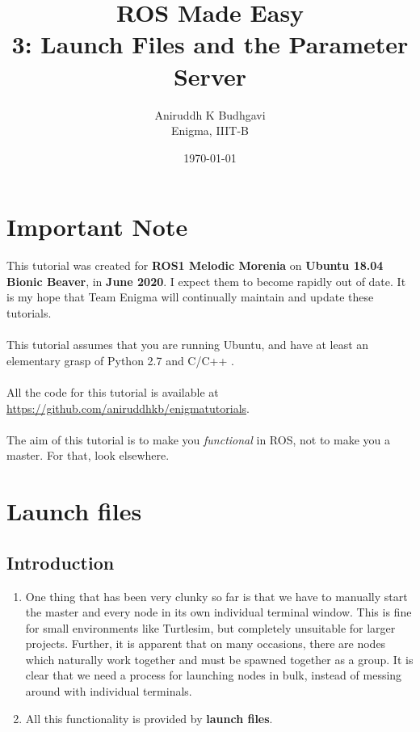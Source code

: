 \documentclass{article}
\title{ROS Made Easy \\3: Launch Files and the Parameter Server}
\date{\today}
\author{Aniruddh K Budhgavi \\Enigma, IIIT-B}
\begin{document}
    \maketitle
    \section{Important Note}
    This tutorial was created for \textbf{ROS1 Melodic Morenia}
    on \textbf{Ubuntu 18.04 Bionic Beaver}, in \textbf{June 2020}.
    I expect them to become rapidly out of date. It is my hope
    that Team Enigma will continually maintain and update these tutorials.
    \\
    \\
    This tutorial assumes that you are running Ubuntu, and have at least an
    elementary grasp of Python 2.7 and C/C++ .
    \\
    \\
    All the code for this tutorial is available at \url{https://github.com/aniruddhkb/enigmatutorials}.
    \\
    \\
    The aim of this tutorial is to make you \emph{functional} in ROS, not to make you a master. For 
    that, look elsewhere.
    \section{Launch files}
        \subsection{Introduction}
        \begin{enumerate}
            \item One thing that has been very clunky so far is that we have to manually start 
            the master and every node in its own individual terminal window. This is fine for 
            small environments like Turtlesim, but completely unsuitable for larger projects.
            Further, it is apparent that on many occasions, there are nodes which naturally work
            together and must be spawned together as a group. It is clear that we need a process 
            for launching nodes in bulk, instead of messing around with individual terminals.

            \item All this functionality is provided by \textbf{launch files}.
        \end{enumerate}
\end{document}
